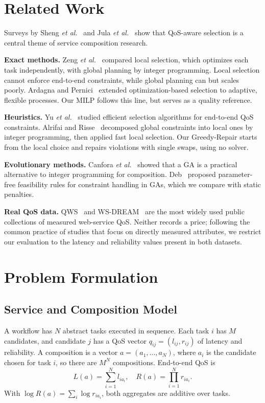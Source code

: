 \documentclass[conference]{IEEEtran}
\begin{document}
\section{Related Work}\label{sec:related}
Surveys by Sheng \emph{et al.}~\cite{sheng2014} and Jula \emph{et al.}~\cite{jula2014} show that QoS-aware selection is a central theme of service composition research.

\textbf{Exact methods.} Zeng \emph{et al.}~\cite{zeng2004} compared local selection, which optimizes each task independently, with global planning by integer programming. Local selection cannot enforce end-to-end constraints, while global planning can but scales poorly. Ardagna and Pernici~\cite{ardagna2007} extended optimization-based selection to adaptive, flexible processes. Our MILP follows this line, but serves as a quality reference.

\textbf{Heuristics.} Yu \emph{et al.}~\cite{yu2007} studied efficient selection algorithms for end-to-end QoS constraints. Alrifai and Risse~\cite{alrifai2009} decomposed global constraints into local ones by integer programming, then applied fast local selection. Our Greedy-Repair starts from the local choice and repairs violations with single swaps, using no solver.

\textbf{Evolutionary methods.} Canfora \emph{et al.}~\cite{canfora2005} showed that a GA is a practical alternative to integer programming for composition. Deb~\cite{deb2000} proposed parameter-free feasibility rules for constraint handling in GAs, which we compare with static penalties.

\textbf{Real QoS data.} QWS~\cite{almasri2007,almasri2008} and WS-DREAM~\cite{zheng2014} are the most widely used public collections of measured web-service QoS. Neither records a price; following the common practice of studies that focus on directly measured attributes, we restrict our evaluation to the latency and reliability values present in both datasets.

\section{Problem Formulation}\label{sec:problem}

\subsection{Service and Composition Model}
A workflow has $N$ abstract tasks executed in sequence. Each task $i$ has $M$ candidates, and candidate $j$ has a QoS vector $q_{ij} = (l_{ij}, r_{ij})$ of latency and reliability. A composition is a vector $a = (a_1,\dots,a_N)$, where $a_i$ is the candidate chosen for task $i$, so there are $M^N$ compositions. End-to-end QoS is
\begin{equation}
L(a) = \sum_{i=1}^{N} l_{i a_i},\quad
R(a) = \prod_{i=1}^{N} r_{i a_i}.
\end{equation}
With $\log R(a) = \sum_i \log r_{i a_i}$, both aggregates are additive over tasks.
\end{document}
